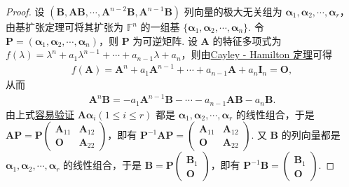 \documentclass[../../main.tex]{subfiles}
\begin{document}
\begin{proof}
设 $(\boldsymbol{B},\boldsymbol{A}\boldsymbol{B},\cdots,\boldsymbol{A}^{n - 2}\boldsymbol{B},\boldsymbol{A}^{n - 1}\boldsymbol{B})$ 列向量的极大无关组为 $\boldsymbol{\alpha}_1,\boldsymbol{\alpha}_2,\cdots,\boldsymbol{\alpha}_r$，由基扩张定理可将其扩张为 $\mathbb{F}^n$ 的一组基 $\{\boldsymbol{\alpha}_1,\boldsymbol{\alpha}_2,\cdots,\boldsymbol{\alpha}_n\}$. 令 $\boldsymbol{P}=(\boldsymbol{\alpha}_1,\boldsymbol{\alpha}_2,\cdots,\boldsymbol{\alpha}_n)$，则 $\boldsymbol{P}$ 为可逆矩阵. 设 $\boldsymbol{A}$ 的特征多项式为 $f(\lambda)=\lambda^n + a_1\lambda^{n - 1}+\cdots + a_{n - 1}\lambda + a_n$，则由\hyperref[theorem:Cayley-Hamilton定理]{Cayley - Hamilton 定理}可得
\begin{align*}
f(\boldsymbol{A})=\boldsymbol{A}^n + a_1\boldsymbol{A}^{n - 1}+\cdots + a_{n - 1}\boldsymbol{A}+a_n\boldsymbol{I}_n=\boldsymbol{O},
\end{align*}
从而
\begin{align}\label{equation12312434-1.1}
\boldsymbol{A}^n\boldsymbol{B}=-a_1\boldsymbol{A}^{n - 1}\boldsymbol{B}-\cdots - a_{n - 1}\boldsymbol{A}\boldsymbol{B}-a_n\boldsymbol{B}.    
\end{align}
由上式\hyperlink{例题0.7容易验证的原因}{容易验证} $\boldsymbol{A}\boldsymbol{\alpha}_i(1\leqslant  i\leqslant  r)$ 都是 $\boldsymbol{\alpha}_1,\boldsymbol{\alpha}_2,\cdots,\boldsymbol{\alpha}_r$ 的线性组合，于是 $\boldsymbol{A}\boldsymbol{P}=\boldsymbol{P}\begin{pmatrix}
\boldsymbol{A}_{11} & \boldsymbol{A}_{12} \\
\boldsymbol{O} & \boldsymbol{A}_{22}
\end{pmatrix}$，即有 $\boldsymbol{P}^{-1}\boldsymbol{A}\boldsymbol{P}=\begin{pmatrix}
\boldsymbol{A}_{11} & \boldsymbol{A}_{12} \\
\boldsymbol{O} & \boldsymbol{A}_{22}
\end{pmatrix}$. 又 $\boldsymbol{B}$ 的列向量都是 $\boldsymbol{\alpha}_1,\boldsymbol{\alpha}_2,\cdots,\boldsymbol{\alpha}_r$ 的线性组合，于是 $\boldsymbol{B}=\boldsymbol{P}\begin{pmatrix}
\boldsymbol{B}_1 \\
\boldsymbol{O}
\end{pmatrix}$，即有 $\boldsymbol{P}^{-1}\boldsymbol{B}=\begin{pmatrix}
\boldsymbol{B}_1 \\
\boldsymbol{O}
\end{pmatrix}$.
\end{proof}
\end{document}
